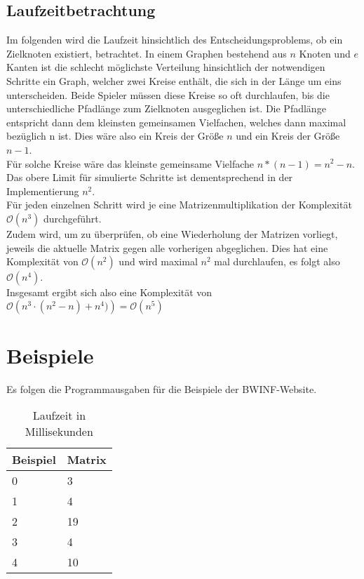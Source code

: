 \subsection{Laufzeitbetrachtung}\label{subsec:laufzeitbetrachtung}
Im folgenden wird die Laufzeit hinsichtlich des Entscheidungsproblems, ob ein Zielknoten existiert, betrachtet.
In einem Graphen bestehend aus $n$ Knoten und $e$ Kanten ist die schlecht möglichste Verteilung hinsichtlich der notwendigen Schritte
ein Graph, welcher zwei Kreise enthält, die sich in der Länge um eins unterscheiden.
Beide Spieler müssen diese Kreise so oft durchlaufen, bis die unterschiedliche Pfadlänge zum Zielknoten ausgeglichen ist.
Die Pfadlänge entspricht dann dem kleinsten gemeinsamen Vielfachen, welches dann maximal bezüglich n ist.
Dies wäre also ein Kreis der Größe $n$ und ein Kreis der Größe $n - 1$. \\
Für solche Kreise wäre das kleinste gemeinsame Vielfache $n * \left(n - 1\right) = n^2 - n$. \\
Das obere Limit für simulierte Schritte ist dementsprechend in der Implementierung $n^2$. \\
Für jeden einzelnen Schritt wird je eine Matrizenmultiplikation der Komplexität $\mathcal{O}(n^3)$ durchgeführt. \\
Zudem wird, um zu überprüfen, ob eine Wiederholung der Matrizen vorliegt, jeweils die aktuelle Matrix gegen alle vorherigen abgeglichen.
Dies hat eine Komplexität von $\mathcal{O}\left(n^2\right)$ und wird
maximal $n^2$ mal durchlaufen, es folgt also $\mathcal{O}\left(n^4\right)$. \\
Insgesamt ergibt sich also eine Komplexität von $\mathcal{O}\left(n^3 \cdot \left(n^2 - n\right) + n^4)\right) = \mathcal{O}\left(n^5\right)$


\section{Beispiele}\label{sec:beispiele}
Es folgen die Programmausgaben für die Beispiele der BWINF-Website. \\
\begin{table}[h]
    \centering
    \begin{tabular}{|l|l|}
        \hline
        Beispiel & Matrix \\ \hline
        0        & 3      \\ \hline
        1        & 4      \\ \hline
        2        & 19     \\ \hline
        3        & 4      \\ \hline
        4        & 10     \\ \hline
    \end{tabular}
    \caption{Laufzeit in Millisekunden}
    \label{tab:my-table}
\end{table}

